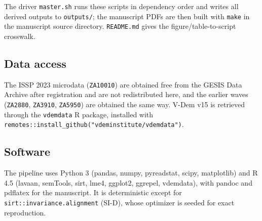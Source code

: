 The driver \texttt{master.sh} runs these scripts in dependency order and writes all derived outputs to \texttt{outputs/}; the manuscript PDFs are then built with \texttt{make} in the manuscript source directory. \texttt{README.md} gives the figure/table-to-script crosswalk.

\subsection*{Data access}

The ISSP 2023 microdata (\texttt{ZA10010}) are obtained free from the GESIS Data Archive after registration and are not redistributed here, and the earlier waves (\texttt{ZA2880}, \texttt{ZA3910}, \texttt{ZA5950}) are obtained the same way. V-Dem v15 is retrieved through the \texttt{vdemdata} R package, installed with \texttt{remotes::\allowbreak install\_github(\allowbreak"vdeminstitute/\allowbreak vdemdata")}.

\subsection*{Software}

The pipeline uses Python 3 (pandas, numpy, pyreadstat, scipy, matplotlib) and R 4.5 (lavaan, semTools, sirt, lme4, ggplot2, ggrepel, vdemdata), with pandoc and pdflatex for the manuscript. It is deterministic except for \texttt{sirt::invariance.alignment} (SI-D), whose optimizer is seeded for exact reproduction.
